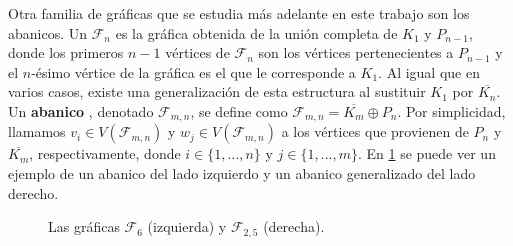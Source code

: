 Otra  familia de gr\'aficas que se estudia m\'as adelante en este trabajo son
los abanicos. Un  $\mathcal{F}_n$ es la gr\'afica obtenida de la
uni\'on completa de $K_1$ y $P_{n-1}$, donde los primeros $n-1$ v\'ertices de
$\mathcal{F}_n$ son los v\'ertices pertenecientes a $P_{n-1}$ y el $n$-\'esimo
v\'ertice de la gr\'afica es el que le corresponde a $K_1$. Al igual que en
varios casos, existe una generalizaci\'on de esta estructura al sustituir $K_1$
por $\overline{K_n}$. Un \textbf{abanico} ,
denotado $\mathcal{F}_{m,n}$, se define como $\mathcal{F}_{m,n}=\overline{K_m}
\oplus P_n$. Por simplicidad, llamamos $v_i \in V(\mathcal{F}_{m,n})$ y $w_j \in
V(\mathcal{F}_{m,n})$ a los v\'ertices que provienen de $P_n$ y
$\overline{K_m}$, respectivamente, donde $i \in \{1, \dots, n\}$ y $j \in \{1,
\dots, m\}$. En \cref{fig:ex-abanico} se puede ver un ejemplo de un abanico del
lado izquierdo y un abanico generalizado del lado derecho.

\begin{figure}[ht!]
    \centering
\caption{Las gr\'aficas $\mathcal{F}_6$ (izquierda) y $\mathcal{F}_{2,5}$
(derecha).}
\label{fig:ex-abanico}
\end{figure}

